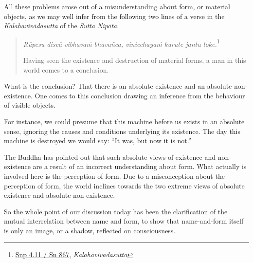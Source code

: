 All these problems arose out of a misunderstanding about form, or material objects, as we may well infer from the following two lines of a verse in the \emph{Kalahavivādasutta} of the \emph{Sutta Nipāta}.

\begin{quote}
\emph{Rūpesu disvā vibhavaṁ bhavañca, vinicchayaṁ kurute jantu loke.}\footnote{\href{https://suttacentral.net/snp4.11/pli/ms}{Snp 4.11 / Sn 867}, \emph{Kalahavivādasutta}}

Having seen the existence and destruction of material forms, a man in this world comes to a conclusion.
\end{quote}

What is the conclusion? That there is an absolute existence and an absolute non-existence. One comes to this conclusion drawing an inference from the behaviour of visible objects.

For instance, we could presume that this machine before us exists in an absolute sense, ignoring the causes and conditions underlying its existence. The day this machine is destroyed we would say: ``It was, but now it is not.''

The Buddha has pointed out that such absolute views of existence and non-existence are a result of an incorrect understanding about form. What actually is involved here is the perception of form. Due to a misconception about the perception of form, the world inclines towards the two extreme views of absolute existence and absolute non-existence.

So the whole point of our discussion today has been the clarification of the mutual interrelation between name and form, to show that name-and-form itself is only an image, or a shadow, reflected on consciousness.
